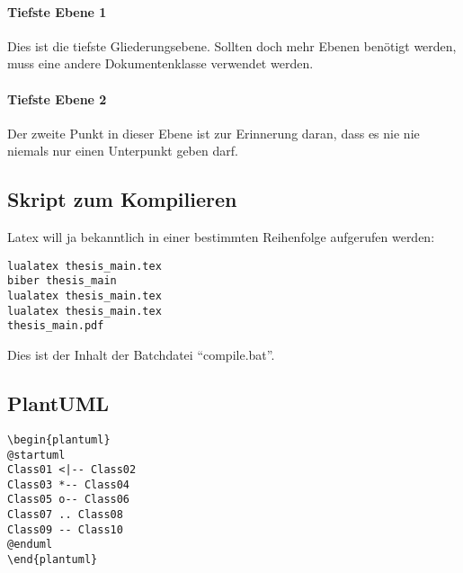 \paragraph{Tiefste Ebene 1}
Dies ist die tiefste Gliederungsebene. Sollten doch mehr Ebenen benötigt werden, muss eine andere Dokumentenklasse verwendet werden.

\paragraph{Tiefste Ebene 2}
Der zweite Punkt in dieser Ebene ist zur Erinnerung daran, dass es nie nie niemals nur einen Unterpunkt geben darf.

\subsection{Skript zum Kompilieren}
Latex will ja bekanntlich in einer bestimmten Reihenfolge aufgerufen werden:
\begin{lstlisting}
lualatex thesis_main.tex
biber thesis_main
lualatex thesis_main.tex
lualatex thesis_main.tex
thesis_main.pdf
\end{lstlisting}

Dies ist der Inhalt der Batchdatei \enquote{compile.bat}.

\subsection{PlantUML}

\begin{lstlisting}
\begin{plantuml}
@startuml
Class01 <|-- Class02
Class03 *-- Class04
Class05 o-- Class06
Class07 .. Class08
Class09 -- Class10
@enduml
\end{plantuml}
\end{lstlisting}
